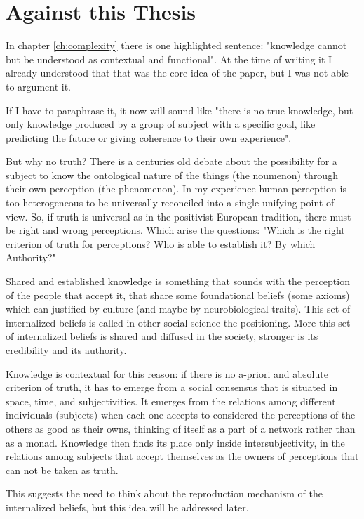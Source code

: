 \chapter{Against this Thesis}
\label{ch:against}
In chapter \ref{ch:complexity} there is one highlighted sentence: "knowledge cannot but be understood as contextual and functional".
At the time of writing it I already understood that that was the core idea of the paper, but I was not able to argument it.

If I have to paraphrase it, it now will sound like "there is no true knowledge, but only knowledge produced by a group of subject with a specific goal, like predicting the future or giving coherence to their own experience".

But why no truth?
There is a centuries old debate about the possibility for a subject to know the ontological nature of the things (the noumenon) through their own perception (the phenomenon).
In my experience human perception is too heterogeneous to be universally reconciled into a single unifying point of view.
So, if truth is universal as in the positivist European tradition, there must be right and wrong perceptions.
Which arise the questions: "Which is the right criterion of truth for perceptions? Who is able to establish it? By which Authority?"

Shared and established knowledge is something that sounds with the perception of the people that accept it, that share some foundational beliefs (some axioms) which can justified by culture (and maybe by neurobiological traits).
This set of internalized beliefs is called in other social science the positioning.
More this set of internalized beliefs is shared and diffused in the society, stronger is its credibility and its authority.

Knowledge is contextual for this reason: if there is no a-priori and absolute criterion of truth, it has to emerge from a social consensus that is situated in space, time, and subjectivities.
It emerges from the relations among different individuals (subjects) when each one accepts to considered the perceptions of the others as good as their owns, thinking of itself as a part of a network rather than as a monad.
Knowledge then finds its place only inside intersubjectivity, in the relations among subjects that accept themselves as the owners of perceptions that can not be taken as truth.

This suggests the need to think about the reproduction mechanism of the internalized beliefs, but this idea will be addressed later.

